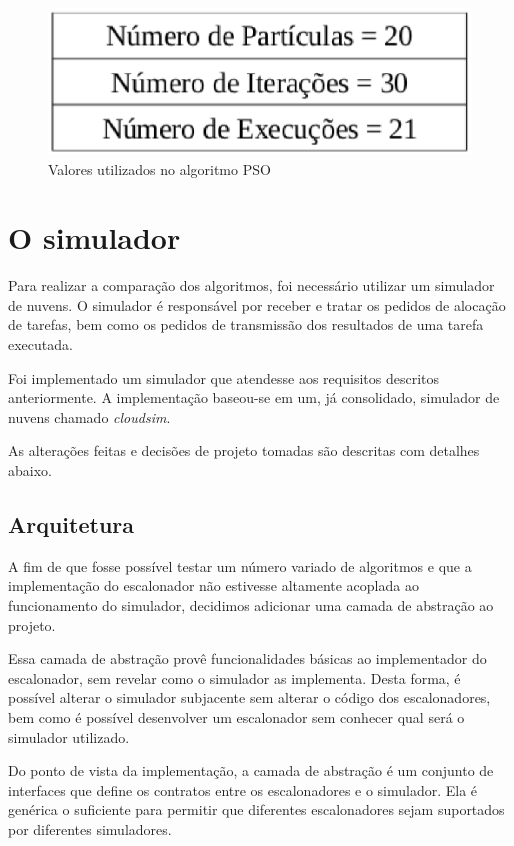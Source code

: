 \documentclass[a4paper,10pt]{article}
\begin{document}
\begin{figure}[!htb]
\centering
\includegraphics[scale=.4]{figures/valuesPSO.eps}
\caption{Valores utilizados no algoritmo PSO}
\label{psoValues}
\end{figure}

\section{O simulador}

Para realizar a comparação dos algoritmos, foi necessário utilizar um simulador de nuvens. O simulador é
responsável por receber e tratar os pedidos de alocação de tarefas, bem como os pedidos de transmissão dos
resultados de uma tarefa executada.

Foi implementado um simulador que atendesse aos requisitos descritos anteriormente. A implementação baseou-se
em um, já consolidado, simulador de nuvens chamado \emph{cloudsim}\cite{cloudsim}.

As alterações feitas e decisões de projeto tomadas são descritas com detalhes abaixo.

\subsection{Arquitetura}

A fim de que fosse possível testar um número variado de algoritmos e que a implementação do escalonador
não estivesse altamente acoplada ao funcionamento do simulador, decidimos adicionar uma camada de abstração
ao projeto.

Essa camada de abstração provê funcionalidades básicas ao implementador do escalonador, sem revelar como o
simulador as implementa. Desta forma, é possível alterar o simulador subjacente sem alterar o código dos escalonadores,
bem como é possível desenvolver um escalonador sem conhecer qual será o simulador utilizado.

Do ponto de vista da implementação, a camada de abstração é um conjunto de interfaces que define os contratos
entre os escalonadores e o simulador.
Ela é genérica o suficiente para permitir que diferentes escalonadores sejam suportados por diferentes simuladores.
\end{document}
